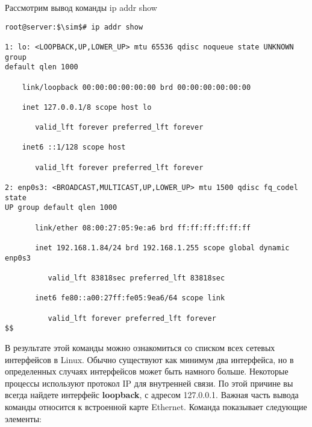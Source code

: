 \documentclass[14pt, a4paper]{article}
\begin{document}
\newpage

Рассмотрим вывод команды \colorbox{backcolour}{ip addr show}

\vspace{0.3cm}
\begin{lstlisting}
root@server:$\sim$# ip addr show

1: lo: <LOOPBACK,UP,LOWER_UP> mtu 65536 qdisc noqueue state UNKNOWN group
default qlen 1000

    link/loopback 00:00:00:00:00:00 brd 00:00:00:00:00:00
    
    inet 127.0.0.1/8 scope host lo

       valid_lft forever preferred_lft forever
       
    inet6 ::1/128 scope host

       valid_lft forever preferred_lft forever

2: enp0s3: <BROADCAST,MULTICAST,UP,LOWER_UP> mtu 1500 qdisc fq_codel state 
UP group default qlen 1000

       link/ether 08:00:27:05:9e:a6 brd ff:ff:ff:ff:ff:ff

       inet 192.168.1.84/24 brd 192.168.1.255 scope global dynamic enp0s3

          valid_lft 83818sec preferred_lft 83818sec

       inet6 fe80::a00:27ff:fe05:9ea6/64 scope link

          valid_lft forever preferred_lft forever
$$
\end{lstlisting}
\vspace{0.2cm}


В результате этой команды можно ознакомиться со списком всех сетевых интерфейсов в Linux.
Обычно существуют как минимум два интерфейса, но в определенных случаях интерфейсов может
быть намного больше. Некоторые процессы используют протокол IP для внутренней связи. По этой
причине вы всегда найдете интерфейс \textbf{loopback}, с адресом 127.0.0.1. Важная часть вывода команды
относится к встроенной карте Ethernet. Команда показывает следующие элементы:
\end{document}
